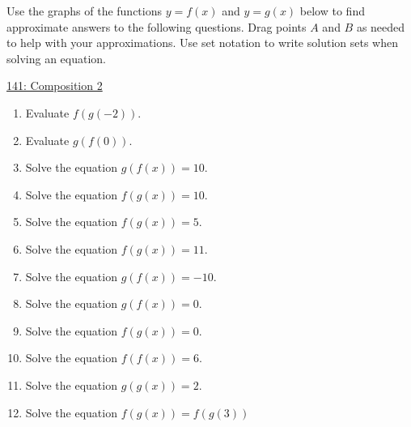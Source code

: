\documentclass{ximera}
\begin{document}
\begin{example}  \label{Erer54r56t364}
Use the graphs of the functions $y=f(x)$ and $y=g(x)$ below to find approximate answers to the following questions. Drag points $A$ and $B$ as needed to help with your approximations. Use set notation to write solution sets when solving an equation.

\begin{onlineOnly}
    \begin{center}
\end{center}
\end{onlineOnly}

\href{https://www.desmos.com/calculator/9uxkofytwi}{141: Composition 2}

\begin{enumerate}

\item Evaluate $f(g(-2))$.

\item Evaluate $g(f(0))$.

\item Solve the equation $g(f(x))=10$.

\item Solve the equation $f(g(x)) = 10$.

\item Solve the equation $f(g(x)) = 5$.

\item Solve the equation $f(g(x)) = 11$.

\item Solve the equation $g(f(x)) = -10$.

\item Solve the equation $g(f(x)) = 0$.

\item Solve the equation $f(g(x)) = 0$.

\item Solve the equation $f(f(x)) = 6$.

\item Solve the equation $g(g(x)) = 2$.

\item Solve the equation $f(g(x)) = f(g(3))$


\end{enumerate}

\end{example}
\end{document}
